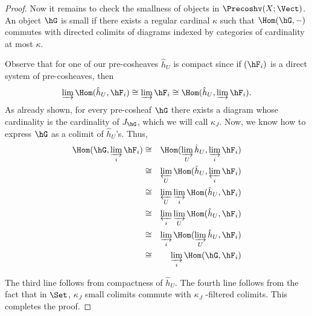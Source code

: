 \begin{proof}
Now it remains to check the smallness of objects in $\Precoshv(X;\Vect)$. An object $\hG$ is small if there exists a regular cardinal $\kappa$ such that $\Hom(\hG,-)$ commutes with directed colimits of diagrams indexed by categories of cardinality at most $\kappa$.

Observe that for one of our pre-cosheaves $\hat{h}_U$ is compact since if $(\hF_i)$ is a direct system of pre-cosheaves, then
\[
\varinjlim\Hom(\hat{h}_U,\hF_i)\cong \varinjlim \hF_i \cong \Hom(\hat{h}_U,\varinjlim \hF_i).
\]
As already shown, for every pre-cosheaf $\hG$ there exists a diagram whose cardinality is the cardinality of $J_{\hG}$, which we will call $\kappa_J$. Now, we know how to express $\hG$ as a colimit of $\hat{h}_U$'s. Thus,
\begin{eqnarray*}
\Hom(\hG,\varinjlim_i \hF_i) &\cong & \Hom(\varinjlim_U \hat{h}_U,\varinjlim_i \hF_i)\\
&\cong &\varprojlim_U \Hom(\hat{h}_U,\varprojlim_i \hF_i) \\
&\cong &\varprojlim_U\varinjlim_i \Hom(\hat{h}_U,\hF_i) \\
&\cong &\varprojlim_i\varinjlim_U \Hom(\hat{h}_U,\hF_i) \\
&\cong &\varinjlim_i\Hom(\varinjlim_U \hat{h}_U,\hF_i) \\
&\cong &\varinjlim_i\Hom(\hG,\hF_i)
\end{eqnarray*}

The third line follows from compactness of $\hat{h}_U$. The fourth line follows from the fact that in $\Set$, $\kappa_J$ small colimits commute with $\kappa_J$ -filtered colimits. This completes the proof.

\end{proof}